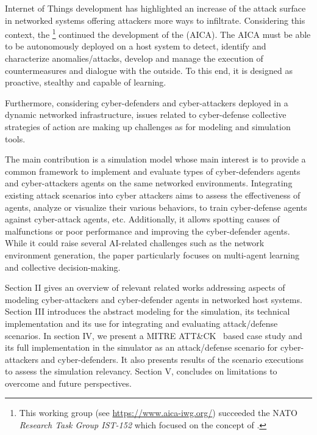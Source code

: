 \documentclass[conference]{IEEEtran}
\begin{document}
\noindent
Internet of Things development has highlighted an increase of the attack surface in networked systems offering attackers more ways to infiltrate.
Considering this context, the \footnote{This working group (see \url{https://www.aica-iwg.org/}) succeeded the NATO \textit{Research Task Group IST-152} which focused on the concept of .} continued the development of the  (AICA).
The AICA must be able to be autonomously deployed on a host system to detect, identify and characterize anomalies/attacks, develop and manage the execution of countermeasures and dialogue with the outside. To this end, it is designed as proactive, stealthy and capable of learning.

Furthermore, considering cyber-defenders and cyber-attackers deployed in a dynamic networked infrastructure, issues related to cyber-defense collective strategies of action are making up challenges as for modeling and simulation tools.

\noindent
The main contribution is a simulation model whose main interest is to provide a common framework to implement and evaluate types of cyber-defenders agents and cyber-attackers agents on the same networked environments. Integrating existing attack scenarios into cyber attackers aims to assess the effectiveness of agents, analyze or visualize their various behaviors, to train cyber-defense agents against cyber-attack agents, etc. Additionally, it allows spotting causes of malfunctions or poor performance and improving the cyber-defender agents. While it could raise several AI-related challenges such as the network environment generation, the paper particularly focuses on multi-agent learning and collective decision-making.

Section II gives an overview of relevant related works addressing aspects of modeling cyber-attackers and cyber-defender agents in networked host systems. Section III introduces the abstract modeling for the simulation, its technical implementation and its use for integrating and evaluating attack/defense scenarios. In section IV, we present a MITRE ATT\&CK~\cite{MITREATTACKWebiste} based case study and its full implementation in the simulator as an attack/defense scenario for cyber-attackers and cyber-defenders. It also presents results of the scenario executions to assess the simulation relevancy. Section V, concludes on limitations to overcome and future perspectives.
\end{document}
